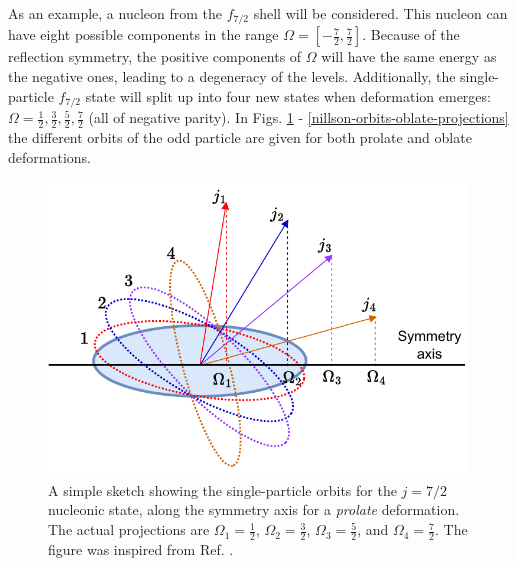 As an example, a nucleon from the $f_{7/2}$ shell will be considered. This nucleon can have eight possible components in the range $\Omega=[-\frac{7}{2},\frac{7}{2}]$. Because of the reflection symmetry, the positive components of $\Omega$ will have the same energy as the negative ones, leading to a degeneracy of the levels. Additionally, the single-particle $f_{7/2}$ state will split up into four new states when deformation emerges: $\Omega=\frac{1}{2},\frac{3}{2},\frac{5}{2},\frac{7}{2}$ (all of negative parity). In Figs. \ref{nillson-orbits-prolate-projections} - \ref{nillson-orbits-oblate-projections} the different orbits of the odd particle are given for both prolate and oblate deformations.
\begin{figure}
    \centering
    \includegraphics[width=0.99\textwidth]{Chapters/Figures/nillson_SP_orbits.pdf}
    \caption{A simple sketch showing the single-particle orbits for the $j=7/2$ nucleonic state, along the symmetry axis for a \emph{prolate} deformation. The actual projections are $\Omega_1=\frac{1}{2}$, $\Omega_2=\frac{3}{2}$, $\Omega_3=\frac{5}{2}$, and $\Omega_4=\frac{7}{2}$. The figure was inspired from Ref. \cite{krane1991introductory}.}
    \label{nillson-orbits-prolate-projections}
\end{figure}
